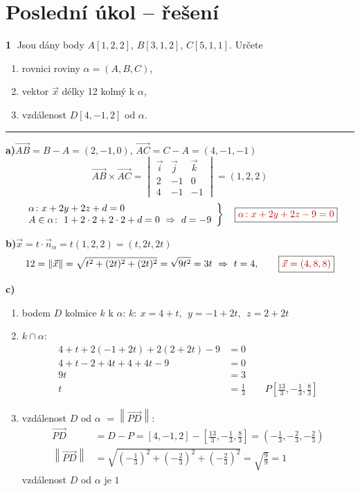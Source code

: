 \documentclass[11pt,a4paper]{article}
\newcommand{\vysl}[1]{\boxed{\color{red!75!black}#1}}
\newcommand{\pozn}[1]{{\color{red!75!black}#1}}
\newcommand{\vv}[1]{\overrightarrow{#1}}
\newcommand{\norm}[1]{\left\|#1\right\|}
\begin{document}
\section*{Poslední úkol -- řešení}

\textbf{\textcircled{1}} Jsou dány body $A[1,2,2]$, $B[3,1,2]$, $C[5,1,1]$. Určete
\begin{enumerate}[label=\alph*), nosep]
\item rovnici roviny $\alpha=(A,B,C)$,
\item vektor $\vec x$ délky 12 kolmý k $\alpha$,
\item vzdálenost $D[4,-1,2]$ od $\alpha$.
\end{enumerate}
\hrule
\medskip

\textbf{a)}\quad $\vv{AB}=B-A=(2,-1,0)$, \qquad $\vv{AC}=C-A=(4,-1,-1)$
\[
\vv{AB}\times\vv{AC} = \begin{vmatrix} \vec i & \vec j & \vec k\\ 2 & -1 & 0\\ 4 & -1 & -1 \end{vmatrix} = (1,2,2)
\]
\[
\left.\begin{array}{l}
\alpha\colon x+2y+2z+d=0\\
A\in\alpha\colon\ 1+2\cdot2+2\cdot2+d=0 \ \Rightarrow\ d=-9
\end{array}\right\}\quad \vysl{\alpha\colon x+2y+2z-9=0}
\]

\textbf{b)}\quad $\vec x=t\cdot\vec n_\alpha=t(1,2,2)=(t,2t,2t)$
\[
12=\norm{\vec x}=\sqrt{t^2+(2t)^2+(2t)^2}=\sqrt{9t^2}=3t \ \Rightarrow\ t=4,\qquad \vysl{\vec x=(4,8,8)}
\]

\textbf{c)}
\begin{enumerate}[label=\arabic*), nosep]
\item bodem $D$ kolmice $k$ k $\alpha$: \quad $k\colon\ x=4+t,\ \ y=-1+2t,\ \ z=2+2t$
\item $k\cap\alpha$:
\begin{align*}
4+t+2(-1+2t)+2(2+2t)-9 &= 0\\
4+t-2+4t+4+4t-9 &= 0\\
9t &= 3\\
t &= \tfrac13 \qquad P\left[\tfrac{13}{3},-\tfrac13,\tfrac83\right]
\end{align*}
\item vzdálenost $D$ od $\alpha$ $=\norm{\vv{PD}}$:
\begin{align*}
\vv{PD} &= D-P = [4,-1,2]-\left[\tfrac{13}{3},-\tfrac13,\tfrac83\right] = \left(-\tfrac13,-\tfrac23,-\tfrac23\right)\\
\norm{\vv{PD}} &= \sqrt{\left(-\tfrac13\right)^2+\left(-\tfrac23\right)^2+\left(-\tfrac23\right)^2} = \sqrt{\tfrac99} = 1
\end{align*}
\pozn{vzdálenost $D$ od $\alpha$ je $\boxed{1}$}
\end{enumerate}
\end{document}
